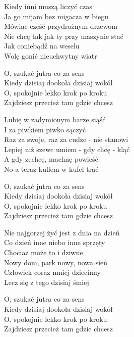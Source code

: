 
\begin{text}
    Kiedy inni muszą liczyć czas\\
    Ja go mijam bez migacza w biegu\\
    Mówiąc cześć przydrożnym drzewom\\
    Nie chcę tak jak ty przy maszynie stać\\
    Jak coniebądź na weselu\\
    Wolę gonić nieuchwytny wiatr

    O, szukać jutra co za sens\\
    Kiedy dzisiaj dookoła dzisiaj wokół\\
    O, spokojnie lekko krok po kroku\\
    Zajdziesz przecież tam gdzie chcesz

    Lubię w zadymionym barze siąść\\
    I za piwkiem piwko sączyć\\
    Raz za swoje, raz za cudze - nie stanowi\\
    Lepiej niż szewc umiem - gdy chcę - kląć\\
    A gdy zechcę, machnę powieść\\
    No a teraz kuflem w kufel trąć

    O, szukać jutra co za sens\\
    Kiedy dzisiaj dookoła dzisiaj wokół\\
    O, spokojnie lekko krok po kroku\\
    Zajdziesz przecież tam gdzie chcesz

    Nie najgorzej żyć jest z dnia na dzień\\
    Co dzień inne niebo inne sprzęty\\
    Chociaż może to i dziwne\\
    Nowy dom, park nowy, nowa sień\\
    Człowiek coraz mniej dziecinny\\
    Lecz się z tego dzisiaj śmiej

    O, szukać jutra co za sens\\
    Kiedy dzisiaj dookoła dzisiaj wokół\\
    O, spokojnie lekko krok po kroku\\
    Zajdziesz przecież tam gdzie chcesz
\end{text}
\begin{chord}

\end{chord}